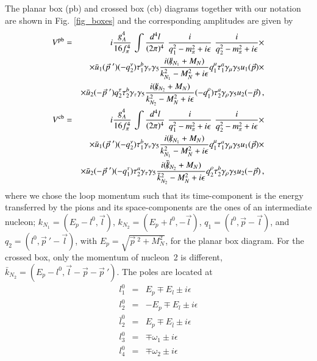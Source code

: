 \documentclass[sort&compress,preprint,3p]{elsarticle}
\begin{document}
The planar box (pb) and crossed box (cb) diagrams together with our notation are shown in Fig.~\ref{fig_boxes}
and the corresponding amplitudes are given by
%
\begin{eqnarray}
V^{\rm pb} &=& i \frac{g_A^4}{16 f_\pi^4} \,
\int \frac{d^4 l}{(2\pi)^4} \,\,
\frac{i}{q_1^2-m_\pi^2+i\epsilon} \,\,
\frac{i}{q_2^2-m_\pi^2+i\epsilon}
\times \nonumber \\ && \times
\bar{u}_1 ({\vec p}~') (-q^\nu_2) \tau^b_1 \gamma_\nu  \gamma_5
\frac{i(\slash \! \! \!  k_{N_1}  + M_N)}{k^2_{N_1} - M_N^2 + i\epsilon}
q_1^\mu \tau^a_1 \gamma_\mu  \gamma_5
u_1 (\vec{p})
\times \nonumber \\ && \times
\bar{u}_2 (-{\vec p}~') q_2^\tau \tau^b_2 \gamma_\tau  \gamma_5
\frac{i(\slash \! \! \!  k_{N_2}  + M_N)}{k^2_{N_2} - M_N^2 + i\epsilon}
(-q_1^\rho) \tau^a_2 \gamma_\rho  \gamma_5
u_2 (-\vec{p})
\,,
\\
V^{\rm cb} &=& i \frac{g_A^4}{16 f_\pi^4} \,
\int \frac{d^4 l}{(2\pi)^4} \,\,
\frac{i}{q_1^2-m_\pi^2+i\epsilon} \,\,
\frac{i}{q_2^2-m_\pi^2+i\epsilon}
\times \nonumber \\ && \times
\bar{u}_1 ({\vec p}~') (-q^\nu_2) \tau^b_1 \gamma_\nu  \gamma_5
\frac{i(\slash \! \! \!  k_{N_1}  + M_N)}{k^2_{N_1} - M_N^2 + i\epsilon}
q_1^\mu \tau^a_1 \gamma_\mu  \gamma_5
u_1 (\vec{p})
\times \nonumber \\ && \times
\bar{u}_2 (-{\vec p}~') (-q_1^\tau) \tau^a_2 \gamma_\tau  \gamma_5
\frac{i(\slash \! \! \!  {\bar k}_{N_2}  + M_N)}{ {\bar k}^2_{N_2} - M_N^2 + i\epsilon}
q_2^\rho \tau^b_2 \gamma_\rho  \gamma_5
u_2 (-\vec{p})
\,,
\end{eqnarray}
%
where we chose the loop momentum such that its time-component is
the energy transferred by the pions and its space-components are the 
ones of an intermediate nucleon;
$k_{N_1}=(E_p-l^0,\vec l)$, 
$k_{N_2}=(E_p+l^0,-\vec l)$, 
$q_1 =(l^0,\vec p - \vec l)$, and
$q_2 =(l^0,{\vec p}~' - \vec l)$, with
$E_p=\sqrt{{\vec p}~^2+M_N^2}$,
for the planar box diagram.
For the crossed box, only the momentum of nucleon~2 is different,
${\bar k}_{N_2}=(E_p-l^0,\vec l-\vec p -{\vec p}~')$.
The poles are located at
%
\begin{eqnarray}
l^0_1 &=& E_p \mp E_l \pm i \epsilon
\nonumber \\
l^0_2 &=& -E_p \mp E_l \pm i \epsilon
\nonumber \\
\bar l^0_2 &=& E_p \mp E_{\bar l} \pm i \epsilon
\nonumber \\
l^0_3 &=& \mp \omega_1 \pm i \epsilon
\nonumber \\
l^0_4 &=& \mp \omega_2 \pm i \epsilon
\end{eqnarray}
\end{document}
